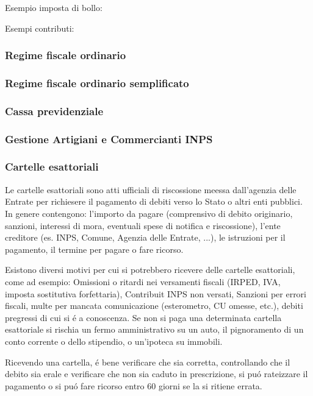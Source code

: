 \documentclass{article}
\begin{document}
Esempio imposta di bollo:

Esempi contributi:

\subsubsection{Regime fiscale ordinario}
\subsubsection{Regime fiscale ordinario semplificato}

\subsubsection{Cassa previdenziale}
\subsubsection{Gestione Artigiani e Commercianti INPS}

\subsubsection{Cartelle esattoriali}
Le cartelle esattoriali sono atti ufficiali di riscossione meessa dall'agenzia delle Entrate per richiesere il pagamento di debiti verso lo Stato o altri enti pubblici. In genere contengono: l'importo da pagare (comprensivo di debito originario, sanzioni, interessi di mora, eventuali spese di notifica e riscossione), l'ente creditore (es. INPS, Comune, Agenzia delle Entrate, ...), le istruzioni per il pagamento, il termine per pagare o fare ricorso. 

Esistono diversi motivi per cui si potrebbero ricevere delle cartelle esattoriali, come ad esempio: Omissioni o ritardi nei versamenti fiscali (IRPED, IVA, imposta sostitutiva forfettaria), Contribuit INPS non versati, Sanzioni per errori fiscali, multe per mancata comunicazione (esterometro, CU omesse, etc.), debiti pregressi di cui si \'e a conoscenza. Se non si paga una determinata cartella esattoriale si rischia un fermo amministrativo su un auto, il pignoramento di un conto corrente o dello stipendio, o un'ipoteca su immobili. 

Ricevendo una cartella, \'e bene verificare che sia corretta, controllando che il debito sia erale e verificare che non sia caduto in prescrizione, si pu\'o rateizzare il pagamento o si pu\'o fare ricorso entro 60 giorni se la si ritiene errata. 
\end{document}
